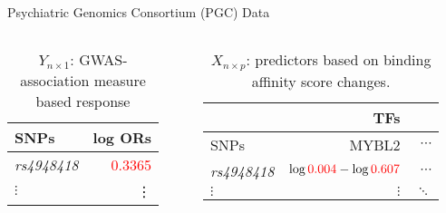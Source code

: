 \documentclass[final]{beamer}
\begin{document}
\begin{frame}{}
\begin{columns}[t]
\begin{column}{1\linewidth}
\begin{columns}
\begin{column}{.38\textwidth}
\begin{block}{Psychiatric Genomics Consortium (PGC) Data}
\begin{columns}
\begin{column}{.34\textwidth}
{\footnotesize
\begin{table}
  \caption{{\small $Y_{n \times 1}$: GWAS-association measure based response}}
 \begin{tabular}{l|r}
      SNPs & log ORs \\ \hline
       \textit{rs4948418} &\textcolor{red}{0.3365}\\
       $\vdots$ & \vdots\\
  \end{tabular}
\end{table}
}
\end{column}

                  \begin{column}{.6\textwidth}   
                  {\footnotesize
                   \begin{table}
                     \caption{{\small $X_{n \times p}$: predictors based on binding affinity score changes.}}
 \begin{tabular}{l|rr}
              & TFs &    \\ \hline
      SNPs & MYBL2 &  $\cdots$  \\ \hline
      \textit{rs4948418} & $\log{\textcolor{red}{0.004}}-\log{\textcolor{red}{0.607}}$ & $\cdots$ \\
       $\vdots$ & $\vdots$ & $\ddots$ \\
  \end{tabular}
\end{table}
}
\end{column}

\end{columns}
%      


\end{block}
\end{column}
\end{columns}
\end{column}
\end{columns}
\end{frame}
\end{document}
